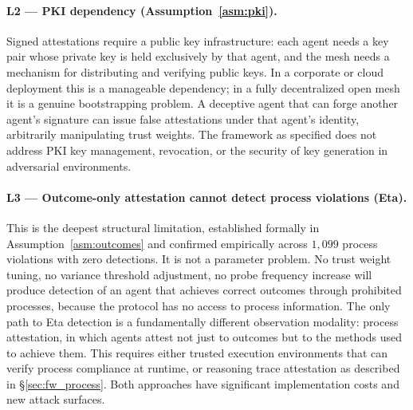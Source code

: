 \paragraph{L2 — PKI dependency (Assumption~\ref{asm:pki}).}
Signed attestations require a public key infrastructure: each agent needs a key pair
whose private key is held exclusively by that agent, and the mesh needs a mechanism for
distributing and verifying public keys.  In a corporate or cloud deployment this is a
manageable dependency; in a fully decentralized open mesh it is a genuine bootstrapping
problem.  A deceptive agent that can forge another agent's signature can issue false
attestations under that agent's identity, arbitrarily manipulating trust weights.  The
framework as specified does not address PKI key management, revocation, or the security
of key generation in adversarial environments.

\paragraph{L3 — Outcome-only attestation cannot detect process violations (Eta).}
This is the deepest structural limitation, established formally in
Assumption~\ref{asm:outcomes} and confirmed empirically across $1{,}099$ process
violations with zero detections.  It is not a parameter problem.  No trust weight tuning,
no variance threshold adjustment, no probe frequency increase will produce detection of
an agent that achieves correct outcomes through prohibited processes, because the protocol
has no access to process information.  The only path to Eta detection is a fundamentally
different observation modality: process attestation, in which agents attest not just to
outcomes but to the methods used to achieve them.  This requires either trusted execution
environments that can verify process compliance at runtime, or reasoning trace attestation
as described in \S\ref{sec:fw_process}.  Both approaches have significant implementation
costs and new attack surfaces.

